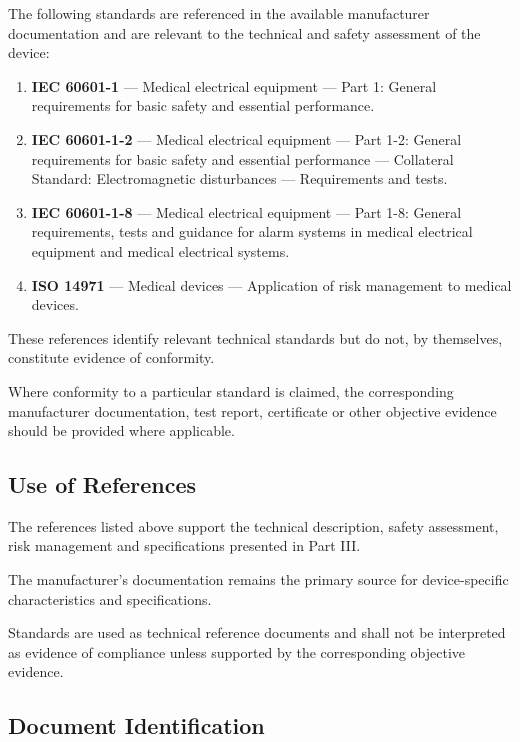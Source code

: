 The following standards are referenced in the available manufacturer
documentation and are relevant to the technical and safety assessment
of the device:

\begin{enumerate}

    \item \textbf{IEC 60601-1} --- Medical electrical equipment ---
    Part 1: General requirements for basic safety and essential
    performance.

    \item \textbf{IEC 60601-1-2} --- Medical electrical equipment ---
    Part 1-2: General requirements for basic safety and essential
    performance --- Collateral Standard: Electromagnetic disturbances
    --- Requirements and tests.

    \item \textbf{IEC 60601-1-8} --- Medical electrical equipment ---
    Part 1-8: General requirements, tests and guidance for alarm
    systems in medical electrical equipment and medical electrical
    systems.

    \item \textbf{ISO 14971} --- Medical devices --- Application of
    risk management to medical devices.

\end{enumerate}

These references identify relevant technical standards but do not,
by themselves, constitute evidence of conformity.

Where conformity to a particular standard is claimed, the corresponding
manufacturer documentation, test report, certificate or other objective
evidence should be provided where applicable.

\subsection{Use of References}

The references listed above support the technical description, safety
assessment, risk management and specifications presented in Part III.

The manufacturer's documentation remains the primary source for
device-specific characteristics and specifications.

Standards are used as technical reference documents and shall not be
interpreted as evidence of compliance unless supported by the
corresponding objective evidence.

\subsection{Document Identification}

